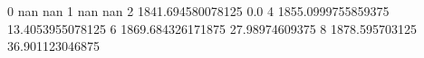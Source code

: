 0 nan nan
1 nan nan
2 1841.694580078125 0.0
4 1855.0999755859375 13.4053955078125
6 1869.684326171875 27.98974609375
8 1878.595703125 36.901123046875
